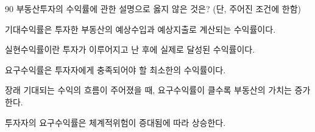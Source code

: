 \begin{question}{90}
부동산투자의 수익률에 관한 설명으로 옳지 않은 것은? (단, 주어진 조건에 한함)
\begin{choices}
  \item 기대수익률은 투자한 부동산의 예상수입과 예상지출로 계산되는 수익률이다.
  \item 실현수익률이란 투자가 이루어지고 난 후에 실제로 달성된 수익률이다.
  \item 요구수익률은 투자자에게 충족되어야 할 최소한의 수익률이다.
  \item 장래 기대되는 수익의 흐름이 주어졌을 때, 요구수익률이 클수록 부동산의 가치는 증가한다.
  \item 투자자의 요구수익률은 체계적위험이 증대됨에 따라 상승한다.
\end{choices}
\end{question}
